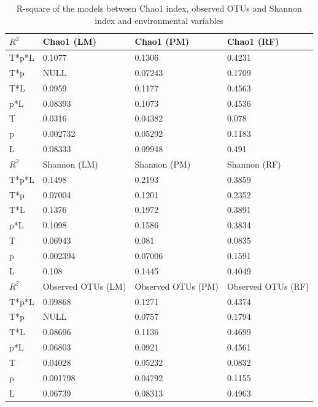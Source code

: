 \documentclass[11pt, a4paper]{article}
\begin{document}
\begin{spacing}{1.5}
\begin{table}
    \caption{R-square of the models between Chao1 index, observed OTUs and Shannon index and environmental variables}
    \centering
    \begin{tabular}{ |m{2cm}<{\centering}|m{4cm}<{\centering}|m{4cm}<{\centering}|m{4cm}<{\centering}|} 
    \hline
     $R^{2}$ & Chao1 (LM) & Chao1 (PM) & Chao1 (RF) \\
     \hline
    T*p*L & 0.1077 & 0.1306 & 0.4231 \\
    T*p & NULL & 0.07243 & 0.1709 \\
    T*L & 0.0959 & 0.1177 & 0.4563 \\
    p*L & 0.08393 & 0.1073 & 0.4536 \\
    T & 0.0316 & 0.04382 & 0.078 \\
    p & 0.002732 & 0.05292 & 0.1183 \\
    L & 0.08333 & 0.09948 & 0.491 \\
    \hline
    \hline
     $R^{2}$ & Shannon (LM) & Shannon (PM) & Shannon (RF) \\
     \hline
    T*p*L & 0.1498 & 0.2193 & 0.3859 \\
    T*p & 0.07004 & 0.1201 & 0.2352 \\
    T*L & 0.1376 & 0.1972 & 0.3891 \\
    p*L & 0.1098 & 0.1586 & 0.3834 \\
    T & 0.06943 & 0.081 & 0.0835 \\
    p & 0.002394 & 0.07006 & 0.1591 \\
    L & 0.108 & 0.1445 & 0.4049 \\
    \hline
    \hline
     $R^{2}$ & Observed OTUs (LM) & Observed OTUs (PM) & Observed OTUs (RF) \\
     \hline
    T*p*L & 0.09868 & 0.1271 & 0.4374 \\
    T*p & NULL & 0.0757 & 0.1794 \\
    T*L & 0.08696 & 0.1136 & 0.4699 \\
    p*L & 0.06803 & 0.0921 & 0.4561 \\
    T & 0.04028 & 0.05232 & 0.0832 \\
    p & 0.001798 & 0.04792 & 0.1155 \\
    L & 0.06739 & 0.08313 & 0.4963 \\
    \hline
    \end{tabular}    
    \label{tab:models}
\end{table}


\end{spacing}
\end{document}
